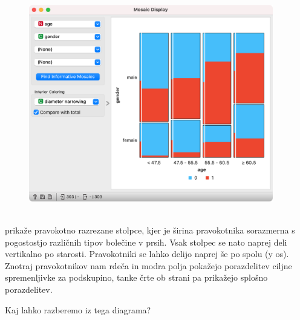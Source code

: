 \begin{figure}[h]
    \centering
    \includegraphics[width=0.95\textwidth]{mosaic-display.png}
    \caption{$\;$}  %
\end{figure}

 prikaže pravokotno razrezane stolpce, kjer je širina pravokotnika sorazmerna s pogostostjo različnih tipov bolečine v prsih. Vsak stolpec se nato naprej deli vertikalno po starosti. Pravokotniki se lahko delijo naprej še po spolu (y os). Znotraj pravokotnikov nam rdeča in modra polja pokažejo porazdelitev ciljne spremenljivke za podskupino, tanke črte ob strani pa prikažejo splošno porazdelitev.

Kaj lahko razberemo iz tega diagrama?

